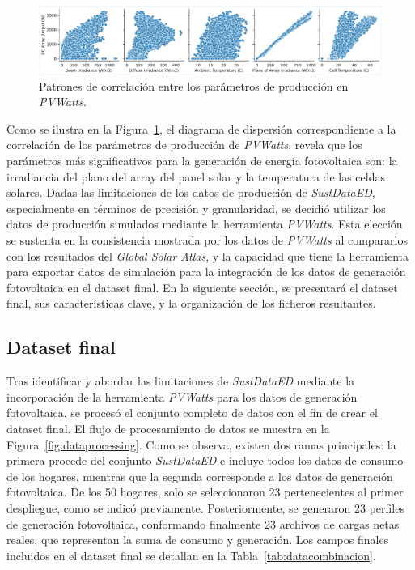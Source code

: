 \begin{figure}[ht!]
    \centering
    \includegraphics[width=\linewidth]{fig/06_fault_sg/fault_sg_04.pdf}
    \caption{Patrones de correlación entre los parámetros de producción en \textit{PVWatts}.}
    \label{fig:corrUST_PVWATTS_graphs}
\end{figure}

Como se ilustra en la Figura~\ref{fig:corrUST_PVWATTS_graphs}, el diagrama de dispersión correspondiente a la correlación de los parámetros de producción de \textit{PVWatts}, revela que los parámetros más significativos para la generación de energía fotovoltaica son: la irradiancia del plano del array del panel solar y la temperatura de las celdas solares. Dadas las limitaciones de los datos de producción de \textit{SustDataED}, especialmente en términos de precisión y granularidad, se decidió utilizar los datos de producción simulados mediante la herramienta \textit{PVWatts}. Esta elección se sustenta en la consistencia mostrada por los datos de \textit{PVWatts} al compararlos con los resultados del \textit{Global Solar Atlas}, y la capacidad que tiene la herramienta para exportar datos de simulación para la integración de los datos de generación fotovoltaica en el dataset final. En la siguiente sección, se presentará el dataset final, sus características clave, y la organización de los ficheros resultantes. 

\subsection{Dataset final}
\label{subsec:keymondata}
Tras identificar y abordar las limitaciones de \textit{SustDataED} mediante la incorporación de la herramienta \textit{PVWatts} para los datos de generación fotovoltaica, se procesó el conjunto completo de datos con el fin de crear el dataset final. El flujo de procesamiento de datos se muestra en la Figura~\ref{fig:dataprocessing}. Como se observa, existen dos ramas principales: la primera procede del conjunto \textit{SustDataED} e incluye todos los datos de consumo de los hogares, mientras que la segunda corresponde a los datos de generación fotovoltaica. De los 50 hogares, solo se seleccionaron 23 pertenecientes al primer despliegue, como se indicó previamente. Posteriormente, se generaron 23 perfiles de generación fotovoltaica, conformando finalmente 23 archivos de cargas netas reales, que representan la suma de consumo y generación. Los campos finales incluidos en el dataset final se detallan en la Tabla~\ref{tab:datacombinacion}.

